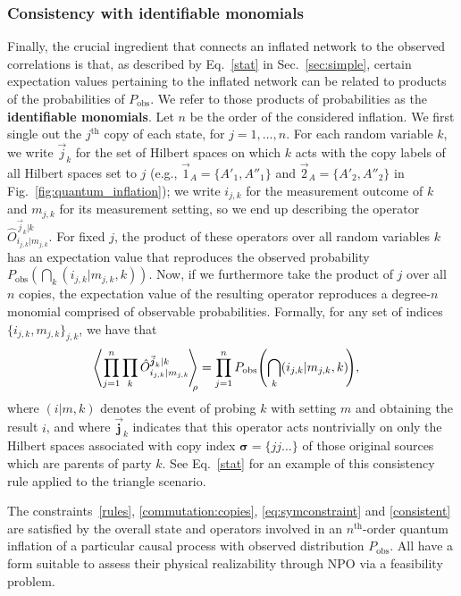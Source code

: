 \documentclass[superscriptaddress,aps,prx,nofootinbib,twocolumn,twoside,reprint,letterpaper,longbibliography]{revtex4-2}
\newcommand{\term}[1]{\textcolor{medblue}{\textbf{#1}}}
\DeclarePairedDelimiter{\expec}{\langle}{\rangle}
\begin{document}
\subsubsection*{Consistency with identifiable monomials}
Finally, the crucial ingredient that connects an inflated network to the observed correlations is that, as described by Eq.~\eqref{stat} in Sec.~\ref{sec:simple}, certain expectation values pertaining to the inflated network can be related to products of the probabilities of $P_\text{obs}$. We refer to those products of probabilities as the \term{identifiable monomials}. Let $n$ be the order of the considered inflation. We first single out the $j^\text{th}$ copy of each state, for $j=1,\ldots,n$. For each random variable $k$, we write $\vec{j}_k$ for the set of Hilbert spaces on which $k$ acts with the copy labels of all Hilbert spaces set to $j$ (e.g., $\vec{1}_A=\{A'_1,A''_1\}$ and $\vec{2}_A=\{A'_2,A''_2\}$ in Fig.~\ref{fig:quantum_inflation}); we write $i_{j,k}$ for the measurement outcome of $k$ and $m_{j,k}$ for its measurement setting, so we end up describing the operator $\hat{O}^{\vec{j}_k|k}_{i_{j,k}|m_{j,k}}$. For fixed $j$, the product of these operators over all random variables $k$ has an expectation value that reproduces the observed probability ${P_\text{obs}}{\left(\bigcap_k (i_{j,k}|m_{j,k},k)\right)}$. Now, if we furthermore take the product of $j$ over all $n$ copies, the expectation value of the resulting operator reproduces a degree-$n$ monomial comprised of observable probabilities. Formally, for any set of indices $\{i_{j,k},m_{j,k}\}_{j,k}$, we have that
\begin{align}
&\expec*{\prod_{j=1}^n\prod_{k}\hat{O}^{\vec{\boldsymbol{j}}_{k}|k}_{i_{j,k}|m_{j,k}}\hspace{-0.3ex}}_{\hspace{-1ex}\rho}=\prod_{j=1}^n {P_\text{obs}}{\left(\bigcap_k (i_{j,k}|m_{j,k},k)\hspace{-0.5ex}\right)},
\label{consistent}
\end{align}
where $(i|m,k)$ denotes the event of probing $k$ with setting $m$ and obtaining the result $i$, and where $\vec{\boldsymbol{j}}_{k}$ indicates that this operator acts nontrivially on only the Hilbert spaces associated with copy index $\boldsymbol{\sigma}{=}\{jj\dots\}$ of those original sources which are parents of party $k$. See Eq.~\eqref{stat} for an example of this consistency rule applied to the triangle scenario.

The constraints~\eqref{rules}, \eqref{commutation:copies}, \eqref{eq:symconstraint} and \eqref{consistent} are satisfied by the overall state and operators involved in an $n^\text{th}$-order quantum inflation of a particular causal process with observed distribution $P_\text{obs}$. All have a form suitable to assess their physical realizability through NPO via a feasibility problem.
\end{document}
